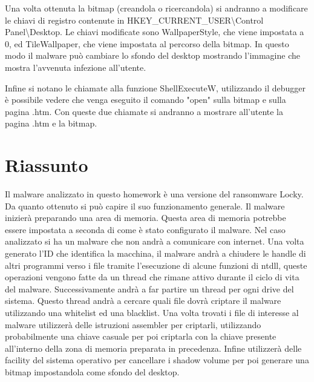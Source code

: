 \documentclass[a4paper,12pt]{article}
\begin{document}
Una volta ottenuta la bitmap (creandola o ricercandola) si andranno a modificare le chiavi di registro contenute in  HKEY\_CURRENT\_USER\textbackslash Control Panel\textbackslash Desktop. Le chiavi modificate sono WallpaperStyle, che viene impostata a 0, ed TileWallpaper, che viene impostata al percorso della bitmap. In questo modo il malware può cambiare lo sfondo del desktop mostrando l'immagine che mostra l'avvenuta infezione all'utente. 

Infine si notano le chiamate alla funzione ShellExecuteW, utilizzando il debugger è possibile vedere che venga eseguito il comando "open" sulla bitmap e sulla pagina .htm. Con queste due chiamate si andranno a mostrare all'utente la pagina .htm e la bitmap.

\section{Riassunto}
Il malware analizzato in questo homework è una versione del ransomware Locky. Da quanto ottenuto si può capire il suo funzionamento generale. Il malware inizierà preparando una area di memoria. Questa area di memoria potrebbe essere impostata a seconda di come è stato configurato il malware. Nel caso analizzato si ha un malware che non andrà a comunicare con internet. Una volta generato l'ID che identifica la macchina, il malware andrà a chiudere le handle di altri programmi verso i file tramite l'esecuzione di alcune funzioni di ntdll, queste operazioni vengono fatte da un thread che rimane attivo durante il ciclo di vita del malware. Successivamente andrà a far partire un thread per ogni drive del sistema. Questo thread andrà a cercare quali file dovrà criptare il malware utilizzando una whitelist ed una blacklist. Una volta trovati i file di interesse al malware utilizzerà delle istruzioni assembler per criptarli, utilizzando probabilmente una chiave casuale per poi criptarla con la chiave presente all'interno della zona di memoria preparata in precedenza. Infine utilizzerà delle facility del sistema operativo per cancellare i shadow volume per poi generare una bitmap impostandola come sfondo del desktop. 
\end{document}
